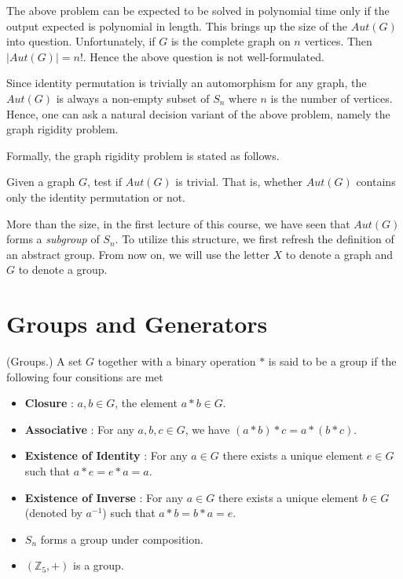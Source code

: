 The above problem can be expected to be solved in polynomial time only if the output expected is polynomial in length. This brings up the size of the $Aut(G)$ into question. Unfortunately, if $G$ is the complete graph on $n$ vertices. Then $|Aut(G)|=n!$. Hence the above question is not well-formulated.

Since identity permutation is trivially an automorphism for any graph, the $Aut(G)$ is always a non-empty subset of $S_n$ where $n$ is the number of vertices. Hence, one can ask a natural decision variant of the above problem, namely the graph rigidity problem.

Formally, the graph rigidity problem is stated as follows.
\begin{problem}
Given a graph $G$, test if $Aut(G)$ is trivial. That is, whether $Aut(G)$ contains only the identity permutation or not.
\end{problem}

More than the size, in the first lecture of this course, we have seen that $Aut(G)$ forms a \textit{subgroup} of $S_n$. To utilize this structure, we first refresh the definition of an abstract group. From now on, we will use the letter $X$ to denote a graph and $G$ to denote a group. 


\section{Groups and Generators}

\begin{definition}(Groups.)
A set $G$ together with a binary operation $*$ is said to be a group if the following four consitions are met
\begin{itemize}
\item \textbf{Closure} : $a,b\in G$, the element $a*b\in G$.
\item \textbf{Associative} : For any $a,b,c\in G$, we have $(a*b)*c = a*(b*c)$.
\item \textbf{Existence of Identity} : For any $a\in G$ there exists a unique element $e\in G$ such that $a*e =e*a =a$. 
\item \textbf{Existence of Inverse} : For any $a\in G$ there exists a unique element $b\in G$(denoted by $a^{-1}$) such that $a*b =b*a =e$. 
\end{itemize}
\end{definition}

\begin{example}
\begin{itemize}
\item $S_n$ forms a group under composition.
\item $(\mathbb{Z}_5,+)$ is a group.
\end{itemize}
\end{example}


